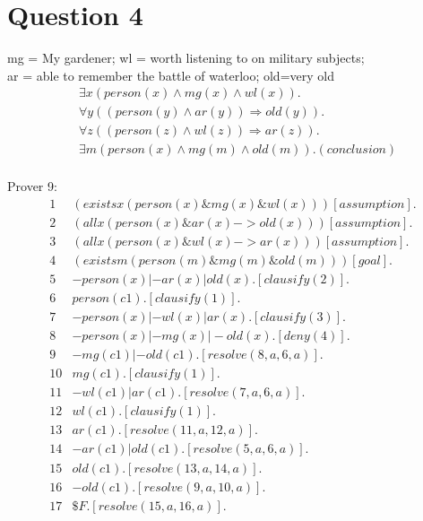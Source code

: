 \documentclass[letterpaper, 12pt]{artikel3}
\begin{document}
\section*{Question 4}
mg = My gardener; wl = worth listening to on military subjects; \\
ar = able to remember the battle of waterloo; old=very old \\
\begin{align*}
& \exists x (person(x) \land mg(x) \land wl(x)). \\
& \forall y ( (person(y) \land ar(y)) \Rightarrow old(y) ). \\
& \forall z ( (person(z) \land wl(z)) \Rightarrow ar(z) ). \\
& \exists m (person(x) \land mg(m) \land old(m)).  (conclusion)\\
\end{align*}

Prover 9:\\
\begin{align*}
1 &(exists x (person(x) \& mg(x) \& wl(x)))  [assumption].\\
2 &(all x (person(x) \& ar(x) -> old(x)))  [assumption].\\
3 &(all x (person(x) \& wl(x) -> ar(x))) [assumption].\\
4 &(exists m (person(m) \& mg(m) \& old(m)))  [goal].\\
5 &-person(x) | -ar(x) | old(x).  [clausify(2)].\\
6 &person(c1).  [clausify(1)].\\
7 &-person(x) | -wl(x) | ar(x).  [clausify(3)].\\
8 &-person(x) | -mg(x) | -old(x).  [deny(4)].\\
9 &-mg(c1) | -old(c1).  [resolve(8,a,6,a)].\\
10 &mg(c1).  [clausify(1)].\\
11 &-wl(c1) | ar(c1).  [resolve(7,a,6,a)].\\
12 &wl(c1).  [clausify(1)].\\
13 &ar(c1).  [resolve(11,a,12,a)].\\
14 &-ar(c1) | old(c1).  [resolve(5,a,6,a)].\\
15 &old(c1).  [resolve(13,a,14,a)].\\
16 &-old(c1).  [resolve(9,a,10,a)].\\
17 &\$F.  [resolve(15,a,16,a)].
\end{align*}
\end{document}
